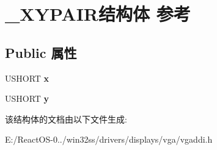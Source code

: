 \hypertarget{struct___x_y_p_a_i_r}{}\section{\+\_\+\+X\+Y\+P\+A\+I\+R结构体 参考}
\label{struct___x_y_p_a_i_r}
\subsection*{Public 属性}
\begin{DoxyCompactItemize}
\item 
\mbox{\label{struct___x_y_p_a_i_r_a88f03bb37704313b8b392be6185697b8}} 
U\+S\+H\+O\+RT {\bfseries x}
\item 
\mbox{\label{struct___x_y_p_a_i_r_a917caf4dacbba968bf615c92ff3376e2}} 
U\+S\+H\+O\+RT {\bfseries y}
\end{DoxyCompactItemize}


该结构体的文档由以下文件生成\+:\begin{DoxyCompactItemize}
\item 
E\+:/\+React\+O\+S-\/0../win32ss/drivers/displays/vga/vgaddi.\+h\end{DoxyCompactItemize}
